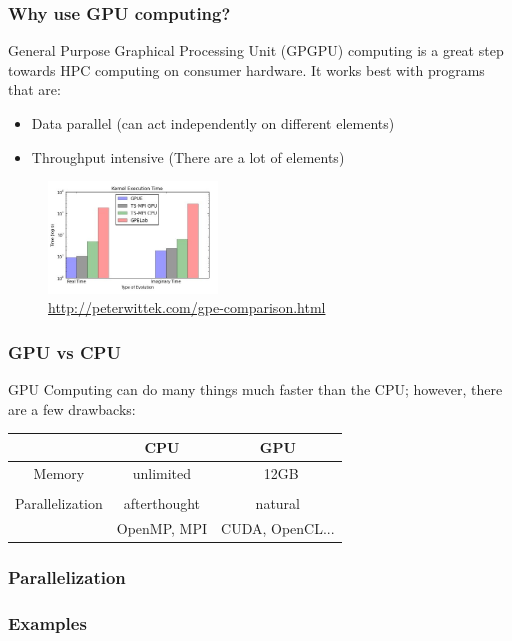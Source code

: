 \documentclass{beamer}
\begin{document}
\begin{frame}
\frametitle{Why use GPU computing?}

General Purpose Graphical Processing Unit (GPGPU) computing is a great step towards HPC computing on consumer hardware. It works best with programs that are:
\begin{itemize}
\item Data parallel (can act independently on different elements)
\item Throughput intensive (There are a lot of elements)
\end{itemize}

\begin{figure}
\begin{center}
\includegraphics[width=0.4\textwidth]{GPUE_BENCHMARKS.jpg}
\end{center}
\caption{\url{http://peterwittek.com/gpe-comparison.html}}
\end{figure}
\end{frame}

\begin{frame}
\frametitle{GPU vs CPU}
GPU Computing can do many things much faster than the CPU; however, there are a few drawbacks:
\begin{center}
\begin{tabular}{c | c | c}
& CPU & GPU \\
\hline
Memory & unlimited & ~12GB \\
& & \\
Parallelization & afterthought & natural \\
& OpenMP, MPI & CUDA, OpenCL...\\

\end{tabular}
\end{center}
\end{frame}

\begin{frame}
\frametitle{Parallelization}
\end{frame}

\begin{frame}
\frametitle{Examples}
\end{frame}
\end{document}
